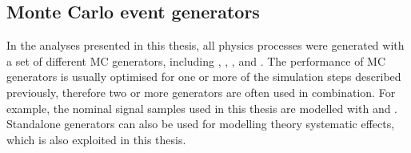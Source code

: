 \subsection{Monte Carlo event generators}
\label{ss:MC_generators}
In the analyses presented in this thesis, all physics processes were generated with a set of different MC generators,
including \MADGRAPH \autocite{MadGraph}, \PYTHIA \autocite{Pythia,Pythia6.4}, \MCATNLO \autocite{MCatNLO}, and \POWHEG
\autocite{POWHEG}. The performance of MC generators is usually optimised for one or more of the simulation steps
described previously, therefore two or more generators are often used in combination. For example, the nominal \ttbar
signal samples used in this thesis are modelled with \MADGRAPH and \PYTHIA. Standalone generators can also be used for
modelling theory systematic effects, which is also exploited in this thesis.


